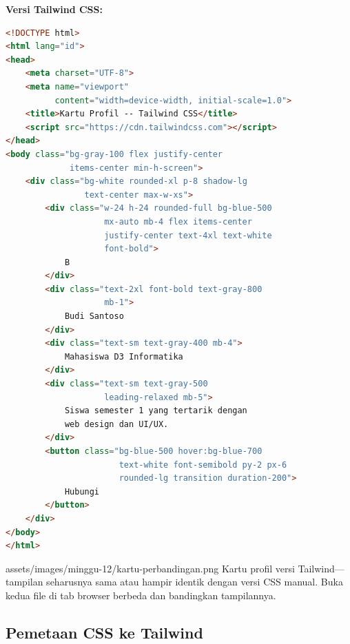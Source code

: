 \textbf{Versi Tailwind CSS:}

\begin{lstlisting}[language=HTML, caption={Kartu profil dengan Tailwind CSS}, label={lst:12-kartu-tailwind}]
<!DOCTYPE html>
<html lang="id">
<head>
    <meta charset="UTF-8">
    <meta name="viewport"
          content="width=device-width, initial-scale=1.0">
    <title>Kartu Profil -- Tailwind CSS</title>
    <script src="https://cdn.tailwindcss.com"></script>
</head>
<body class="bg-gray-100 flex justify-center
             items-center min-h-screen">
    <div class="bg-white rounded-xl p-8 shadow-lg
                text-center max-w-xs">
        <div class="w-24 h-24 rounded-full bg-blue-500
                    mx-auto mb-4 flex items-center
                    justify-center text-4xl text-white
                    font-bold">
            B
        </div>
        <div class="text-2xl font-bold text-gray-800
                    mb-1">
            Budi Santoso
        </div>
        <div class="text-sm text-gray-400 mb-4">
            Mahasiswa D3 Informatika
        </div>
        <div class="text-sm text-gray-500
                    leading-relaxed mb-5">
            Siswa semester 1 yang tertarik dengan
            web design dan UI/UX.
        </div>
        <button class="bg-blue-500 hover:bg-blue-700
                       text-white font-semibold py-2 px-6
                       rounded-lg transition duration-200">
            Hubungi
        </button>
    </div>
</body>
</html>
\end{lstlisting}

\begin{tangkapanlayar}
  {assets/images/minggu-12/kartu-perbandingan.png}
  {Kartu profil versi Tailwind---tampilan seharusnya sama atau hampir identik dengan versi CSS manual.}
  {Buka kedua file di tab browser berbeda dan bandingkan tampilannya.}
\end{tangkapanlayar}

\subsection{Pemetaan CSS ke Tailwind}


